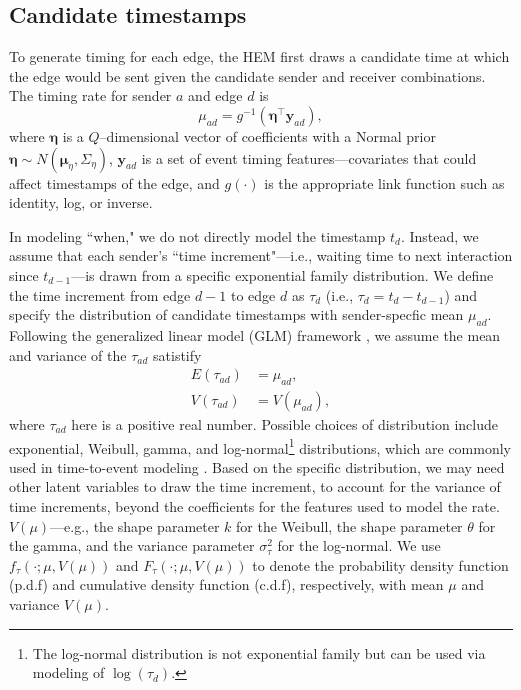 \documentclass[ba]{imsart}
\numberwithin{equation}{section}
\theoremstyle{plain}
\begin{document}
	\subsection{Candidate timestamps}\label{subsec:Time}
	To generate timing for each edge, the HEM first draws a candidate time at which the edge would be sent given the candidate sender and receiver combinations. The timing rate for sender $a$ and edge $d$ is
	\begin{equation}
		\mu_{ad} = g^{-1}(\boldsymbol{\eta}^\top \boldsymbol{y}_{ad}),
	\end{equation}
	where $\boldsymbol{\eta}$ is a $Q$--dimensional vector of coefficients with a Normal prior $\boldsymbol{\eta} \sim N(\boldsymbol{\mu}_\eta,\Sigma_\eta)$, $\boldsymbol{y}_{ad}$ is a set of event timing features---covariates that could affect timestamps of the edge, and $g(\cdot)$ is the appropriate link function such as identity, log, or inverse. 
	
	In modeling ``when," we do not directly model the timestamp $t_d$. Instead, we assume that each sender's ``time increment"---i.e., waiting time to next interaction since $t_{d-1}$---is drawn from a specific exponential family distribution. We define the time increment from edge $d-1$ to edge $d$ as $\tau_{d}$ (i.e., $\tau_{d}= t_d-t_{d-1}$) and specify the distribution of candidate timestamps with sender-specfic mean $\mu_{ad}$. Following the generalized linear model (GLM) framework \citep{nelder1972generalized}, we assume the mean and variance of the $\tau_{ad}$ satistify
	\begin{equation}
		\begin{aligned}
			E(\tau_{ad}) &= \mu_{ad},\\
			V(\tau_{ad}) &= V(\mu_{ad}),
		\end{aligned}
	\end{equation}
	where $\tau_{ad}$ here is a positive real number. Possible choices of distribution include exponential, Weibull, gamma, and log-normal\footnote{The log-normal distribution is not exponential family but can be used via modeling of $\log(\tau_d)$.} distributions, which are commonly used in time-to-event modeling \citep{rao2000applied,rizopoulos2012joint}. Based on the specific distribution, we may need other latent variables to draw the time increment, to account for the variance of time increments, beyond the coefficients for the features used to model the rate. $V(\mu)$---e.g., the shape parameter $k$ for the Weibull, the shape parameter $\theta$ for the gamma, and the variance parameter $\sigma_\tau^2$ for the log-normal. We use $f_\tau(\cdot; \mu, V(\mu))$ and $F_\tau(\cdot; \mu, V(\mu))$ to denote the probability density function (p.d.f) and cumulative density function (c.d.f), respectively, with mean $\mu$ and variance $V(\mu)$.
	\newpage
\end{document}
